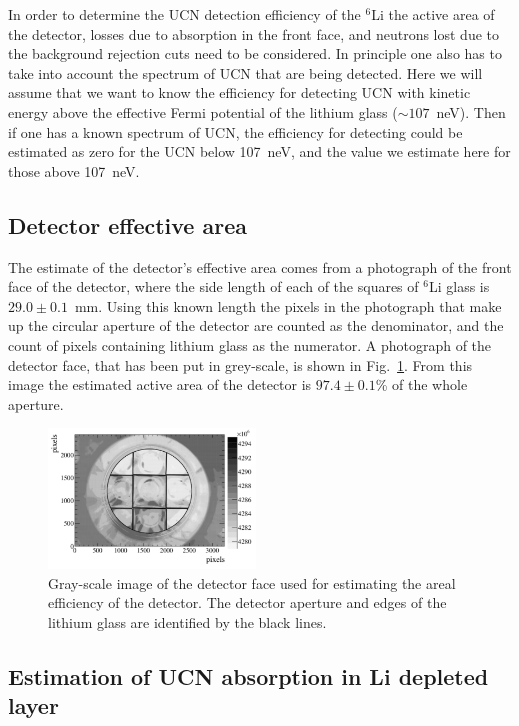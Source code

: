\documentclass[review]{elsarticle}
\begin{document}
In order to determine the UCN detection efficiency of the $^{6}$Li the
active area of the detector, losses due to absorption in the front
face, and neutrons lost due to the background rejection cuts need to
be considered.  In principle one also has to take into account the
spectrum of UCN that are being detected.  Here we will assume that we
want to know the efficiency for detecting UCN with kinetic energy
above the effective Fermi potential of the lithium glass ($\sim
107$~neV).  Then if one has a known spectrum of UCN, the efficiency
for detecting could be estimated as zero for the UCN below 107~neV,
and the value we estimate here for those above 107~neV.


\subsection{ Detector effective area }

The estimate of the detector's effective area comes from a photograph
of the front face of the detector, where the side length of each of
the squares of $^6$Li glass is $29.0\pm0.1$~mm.  Using this known
length the pixels in the photograph that make up the circular aperture
of the detector are counted as the denominator, and the count of
pixels containing lithium glass as the numerator.  A photograph of the
detector face, that has been put in grey-scale, is shown in
Fig.~\ref{fig:detface}.  From this image the estimated active area of
the detector is $97.4\pm0.1$\% of the whole aperture.

\begin{figure}[!htpb]
\centering \includegraphics[width = 0.49\textwidth]{figures/detface.pdf}
\caption{Gray-scale image of the detector face used for estimating the
  areal efficiency of the detector.  The detector aperture and edges
  of the lithium glass are identified by the black lines.}
\label{fig:detface}
\end{figure}

\subsection{ Estimation of UCN absorption in Li depleted layer }
\end{document}
